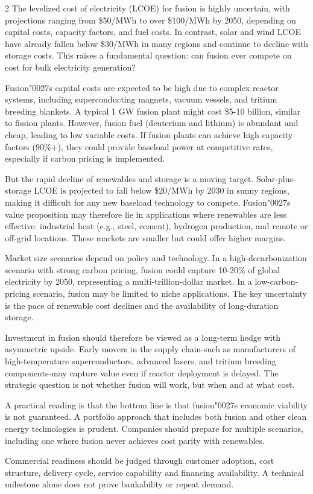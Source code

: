 \documentclass[10pt,a4paper]{article}
\newcommand{\BOApos}{{\BOQuoteFont\char"0027}}
\begin{document}
\begin{multicols}{2}
{\small The levelized cost of electricity (LCOE) for fusion is highly uncertain, with projections ranging from \$50/MWh to over \$100/MWh by 2050, depending on capital costs, capacity factors, and fuel costs. In contrast, solar and wind LCOE have already fallen below \$30/MWh in many regions and continue to decline with storage costs. This raises a fundamental question: can fusion ever compete on cost for bulk electricity generation?}\par
{\small Fusion\BOApos{}s capital costs are expected to be high due to complex reactor systems, including superconducting magnets, vacuum vessels, and tritium breeding blankets. A typical 1 GW fusion plant might cost \$5-10 billion, similar to fission plants. However, fusion fuel (deuterium and lithium) is abundant and cheap, leading to low variable costs. If fusion plants can achieve high capacity factors (90\%+), they could provide baseload power at competitive rates, especially if carbon pricing is implemented.}\par
{\small But the rapid decline of renewables and storage is a moving target. Solar-plus-storage LCOE is projected to fall below \$20/MWh by 2030 in sunny regions, making it difficult for any new baseload technology to compete. Fusion\BOApos{}s value proposition may therefore lie in applications where renewables are less effective: industrial heat (e.g., steel, cement), hydrogen production, and remote or off-grid locations. These markets are smaller but could offer higher margins.}\par
{\small Market size scenarios depend on policy and technology. In a high-decarbonization scenario with strong carbon pricing, fusion could capture 10-20\% of global electricity by 2050, representing a multi-trillion-dollar market. In a low-carbon-pricing scenario, fusion may be limited to niche applications. The key uncertainty is the pace of renewable cost declines and the availability of long-duration storage.}\par
{\small Investment in fusion should therefore be viewed as a long-term hedge with asymmetric upside. Early movers in the supply chain-such as manufacturers of high-temperature superconductors, advanced lasers, and tritium breeding components-may capture value even if reactor deployment is delayed. The strategic question is not whether fusion will work, but when and at what cost.}\par
{\small A practical reading is that the bottom line is that fusion\BOApos{}s economic viability is not guaranteed. A portfolio approach that includes both fusion and other clean energy technologies is prudent. Companies should prepare for multiple scenarios, including one where fusion never achieves cost parity with renewables.}\par
{\small Commercial readiness should be judged through customer adoption, cost structure, delivery cycle, service capability and financing availability. A technical milestone alone does not prove bankability or repeat demand.}\par
\end{multicols}
\label{chap:2:end}
\end{document}
